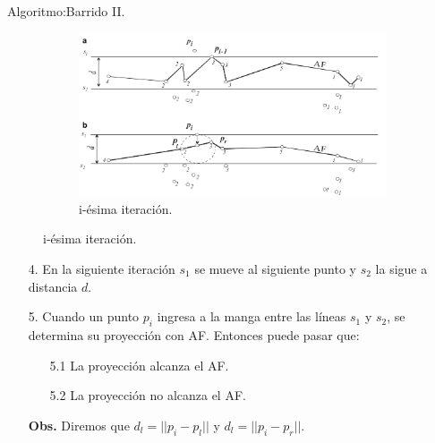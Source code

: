 \begin{frame}[fragile]{Algoritmo:}{Barrido II.}
  \begin{figure}
    \centering
    \begin{subfigure}[b]{0.6\textwidth}
      \includegraphics[width=\textwidth]{./Imagenes/Barrido.png}
      \caption*{i-ésima iteración.}
    \end{subfigure}
  \end{figure}
  \begin{enumerate}
  \item[4.] En la siguiente iteración $s_1$ se mueve al siguiente punto y $s_2$ la sigue
    a distancia $d$.
  \item[5.] Cuando un punto $p_i$ ingresa a la manga entre las líneas $s_1$ y $s_2$, se determina
    su proyección con AF. Entonces puede pasar que:
    \begin{enumerate}
    \item[5.1] La proyección alcanza el AF.
    \item[5.2] La proyección no alcanza el AF.
    \end{enumerate}
    \textbf{Obs.} Diremos que $d_l = ||p_i - p_l||$ y $d_l = ||p_i - p_r||.$
  \end{enumerate}
\end{frame}

